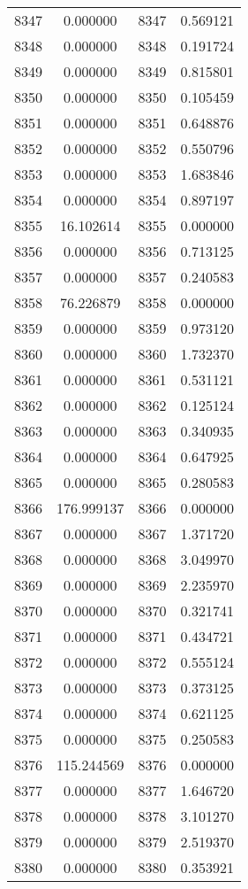 \documentclass[12pt]{article}
\begin{document}
\begin{longtable}{@{}cccc@{}}
8347 & 0.000000 & 8347 & 0.569121 \\
8348 & 0.000000 & 8348 & 0.191724 \\
8349 & 0.000000 & 8349 & 0.815801 \\
8350 & 0.000000 & 8350 & 0.105459 \\
8351 & 0.000000 & 8351 & 0.648876 \\
8352 & 0.000000 & 8352 & 0.550796 \\
8353 & 0.000000 & 8353 & 1.683846 \\
8354 & 0.000000 & 8354 & 0.897197 \\
8355 & 16.102614 & 8355 & 0.000000 \\
8356 & 0.000000 & 8356 & 0.713125 \\
8357 & 0.000000 & 8357 & 0.240583 \\
8358 & 76.226879 & 8358 & 0.000000 \\
8359 & 0.000000 & 8359 & 0.973120 \\
8360 & 0.000000 & 8360 & 1.732370 \\
8361 & 0.000000 & 8361 & 0.531121 \\
8362 & 0.000000 & 8362 & 0.125124 \\
8363 & 0.000000 & 8363 & 0.340935 \\
8364 & 0.000000 & 8364 & 0.647925 \\
8365 & 0.000000 & 8365 & 0.280583 \\
8366 & 176.999137 & 8366 & 0.000000 \\
8367 & 0.000000 & 8367 & 1.371720 \\
8368 & 0.000000 & 8368 & 3.049970 \\
8369 & 0.000000 & 8369 & 2.235970 \\
8370 & 0.000000 & 8370 & 0.321741 \\
8371 & 0.000000 & 8371 & 0.434721 \\
8372 & 0.000000 & 8372 & 0.555124 \\
8373 & 0.000000 & 8373 & 0.373125 \\
8374 & 0.000000 & 8374 & 0.621125 \\
8375 & 0.000000 & 8375 & 0.250583 \\
8376 & 115.244569 & 8376 & 0.000000 \\
8377 & 0.000000 & 8377 & 1.646720 \\
8378 & 0.000000 & 8378 & 3.101270 \\
8379 & 0.000000 & 8379 & 2.519370 \\
8380 & 0.000000 & 8380 & 0.353921 \\

\end{longtable}
\end{document}
